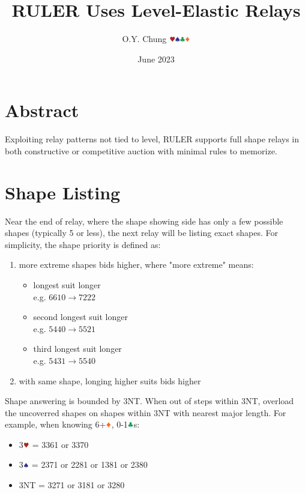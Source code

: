 \documentclass{article}
\title{RULER Uses Level-Elastic Relays}
\author{O.Y. Chung $\hhh\sss\ccc\ddd$}
\date{June 2023}
\begin{document}
\begin{CJK*}{UTF8}{gbsn}
\end{CJK*}
\maketitle

\begin{multicols}{2}

\section{Abstract}
Exploiting relay patterns not tied to level, RULER supports full shape relays in both constructive or competitive auction with minimal rules to memorize.

\section{Shape Listing}
Near the end of relay, where the shape showing side has only a few possible shapes (typically 5 or less), the next relay will be listing exact shapes. For simplicity, the shape priority is defined as:

\begin{enumerate}
    \item more extreme shapes bids higher, where "more extreme" means:
    \begin{itemize}
        \item longest suit longer \\
            e.g. $6610 \rightarrow 7222$
        \item second longest suit longer \\
            e.g. $5440 \rightarrow 5521$
        \item third longest suit longer \\
            e.g. $5431 \rightarrow 5540$
    \end{itemize}
    \item with same shape, longing higher suits bids higher
\end{enumerate}

\noindent Shape answering is bounded by 3NT. When out of steps within 3NT, overload the uncoverred shapes on shapes within 3NT with nearest major length. For example, when knowing 6+$\ddd$, 0-1$\ccc$s:
\begin{itemize}
    \item 3$\hhh$ = 3361 or 3370
    \item 3$\sss$ = 2371 or 2281 or 1381 or 2380
    \item 3NT = 3271 or 3181 or 3280
\end{itemize}


\end{multicols}
\end{document}
